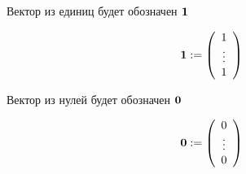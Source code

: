\begin{frame}

    \vspace{2em}
    Вектор из единиц будет обозначен ${\mathbf 1}$ 
    
    \begin{equation*}
        {\mathbf 1} := 
        \left(
        \begin{array}{c}
            1 \\
            \vdots \\
            1
        \end{array}
        \right)
    \end{equation*}

    Вектор из нулей будет обозначен ${\mathbf 0}$

    \begin{equation*}
        {\mathbf 0} := 
        \left(
        \begin{array}{c}
            0 \\
            \vdots \\
            0
        \end{array}
        \right)
    \end{equation*}

\end{frame}


